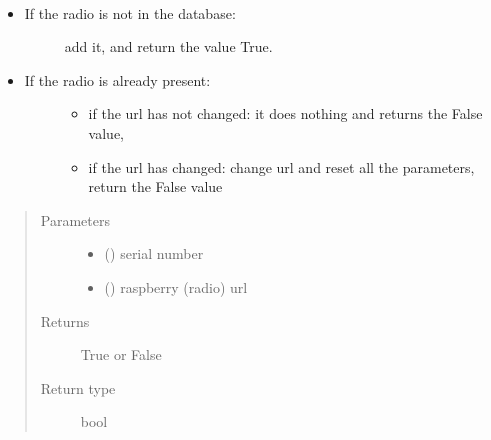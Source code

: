 \documentclass[letterpaper,10pt,english]{sphinxmanual}
\begin{document}

\begin{fulllineitems}
\label{\detokenize{index:controller.utility.add_radio}}~\begin{itemize}
\item {} \begin{description}
\item[{If the radio is not in the database:}] \leavevmode
add it, and return the value True.

\end{description}

\item {} \begin{description}
\item[{If the radio is already present:}] \leavevmode\begin{itemize}
\item {} 
if the url has not changed: it does nothing and returns the False value,

\item {} 
if the url has changed: change url and reset all the parameters, return the False value

\end{itemize}

\end{description}

\end{itemize}
\begin{quote}\begin{description}
\item[{Parameters}] \leavevmode\begin{itemize}
\item {} 
 () \textendash{} serial number

\item {} 
 () \textendash{} raspberry (radio) url

\end{itemize}

\item[{Returns}] \leavevmode
True or False

\item[{Return type}] \leavevmode
bool

\end{description}\end{quote}

\end{fulllineitems}
\end{document}
